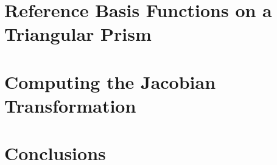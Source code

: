 \documentclass[11pt]{article}
\begin{document}
\section{Reference Basis Functions on a Triangular Prism}
\label{sec::triprismref}

\section{Computing the Jacobian Transformation}
\label{sec::jacobian}


\section{Conclusions}
\label{sec::conclusions}



\end{document}

